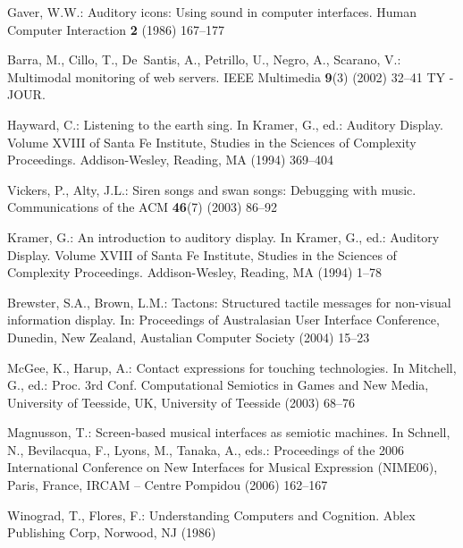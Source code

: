 \documentclass[runningheads]{llncs}
\begin{document}
\begin{thebibliography}{10}
Gaver, W.W.:
\newblock Auditory icons: Using sound in computer interfaces.
\newblock Human Computer Interaction \textbf{2} (1986)  167--177 

Barra, M., Cillo, T., De~Santis, A., Petrillo, U., Negro, A., Scarano, V.:
\newblock Multimodal monitoring of web servers.
\newblock IEEE Multimedia \textbf{9}(3) (2002)  32--41 TY - JOUR.

Hayward, C.:
\newblock Listening to the earth sing.
\newblock In Kramer, G., ed.: Auditory Display. Volume XVIII of Santa Fe
  Institute, Studies in the Sciences of Complexity Proceedings.
\newblock Addison-Wesley, Reading, MA (1994)  369--404 

Vickers, P., Alty, J.L.:
\newblock Siren songs and swan songs: Debugging with music.
\newblock Communications of the ACM \textbf{46}(7) (2003)  86--92

Kramer, G.:
\newblock An introduction to auditory display.
\newblock In Kramer, G., ed.: Auditory Display. Volume XVIII of Santa Fe
  Institute, Studies in the Sciences of Complexity Proceedings.
\newblock Addison-Wesley, Reading, MA (1994)  1--78 

Brewster, S.A., Brown, L.M.:
\newblock Tactons: Structured tactile messages for non-visual information
  display.
\newblock In: Proceedings of Australasian User Interface Conference, Dunedin,
  New Zealand, Austalian Computer Society (2004)  15--23

McGee, K., Harup, A.:
\newblock Contact expressions for touching technologies.
\newblock In Mitchell, G., ed.: Proc. 3rd Conf. Computational Semiotics in
  Games and New Media, University of Teesside, UK, University of Teesside
  (2003)  68--76

Magnusson, T.:
\newblock Screen-based musical interfaces as semiotic machines.
\newblock In Schnell, N., Bevilacqua, F., Lyons, M., Tanaka, A., eds.:
  Proceedings of the 2006 International Conference on New Interfaces for
  Musical Expression (NIME06), Paris, France, IRCAM -- Centre Pompidou (2006)
  162--167

Winograd, T., Flores, F.:
\newblock Understanding Computers and Cognition.
\newblock Ablex Publishing Corp, Norwood, NJ (1986)

\end{thebibliography}
\end{document}
